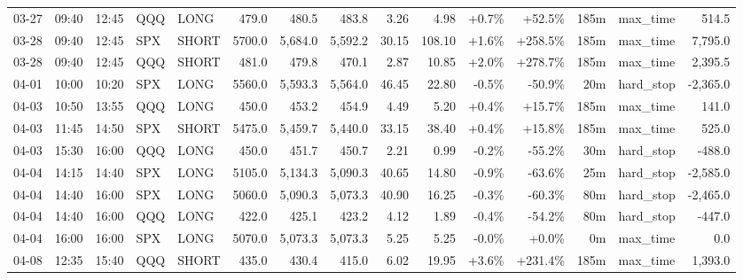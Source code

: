 \documentclass[11pt,a4paper,twoside]{article}
\begin{document}
\begin{landscape}
\begin{center}
\begin{longtable}{>{\color{txtmain}}l l l l l r r r r r r r r >{\color{txtmain}}l r}
03-27 & 09:40 & 12:45 & QQQ & LONG & 479.0 & 480.5 & 483.8 & 3.26 & 4.98 & \textcolor{wingreen}{+0.7\%} & \textcolor{wingreen}{+52.5\%} & 185m & max\_time & \textcolor{wingreen}{514.5} \\
03-28 & 09:40 & 12:45 & SPX & SHORT & 5700.0 & 5,684.0 & 5,592.2 & 30.15 & 108.10 & \textcolor{wingreen}{+1.6\%} & \textcolor{wingreen}{+258.5\%} & 185m & max\_time & \textcolor{wingreen}{7,795.0} \\
03-28 & 09:40 & 12:45 & QQQ & SHORT & 481.0 & 479.8 & 470.1 & 2.87 & 10.85 & \textcolor{wingreen}{+2.0\%} & \textcolor{wingreen}{+278.7\%} & 185m & max\_time & \textcolor{wingreen}{2,395.5} \\
04-01 & 10:00 & 10:20 & SPX & LONG & 5560.0 & 5,593.3 & 5,564.0 & 46.45 & 22.80 & \textcolor{lossred}{-0.5\%} & \textcolor{lossred}{-50.9\%} & 20m & hard\_stop & \textcolor{lossred}{-2,365.0} \\
04-03 & 10:50 & 13:55 & QQQ & LONG & 450.0 & 453.2 & 454.9 & 4.49 & 5.20 & \textcolor{wingreen}{+0.4\%} & \textcolor{wingreen}{+15.7\%} & 185m & max\_time & \textcolor{wingreen}{141.0} \\
04-03 & 11:45 & 14:50 & SPX & SHORT & 5475.0 & 5,459.7 & 5,440.0 & 33.15 & 38.40 & \textcolor{wingreen}{+0.4\%} & \textcolor{wingreen}{+15.8\%} & 185m & max\_time & \textcolor{wingreen}{525.0} \\
04-03 & 15:30 & 16:00 & QQQ & LONG & 450.0 & 451.7 & 450.7 & 2.21 & 0.99 & \textcolor{lossred}{-0.2\%} & \textcolor{lossred}{-55.2\%} & 30m & hard\_stop & \textcolor{lossred}{-488.0} \\
04-04 & 14:15 & 14:40 & SPX & LONG & 5105.0 & 5,134.3 & 5,090.3 & 40.65 & 14.80 & \textcolor{lossred}{-0.9\%} & \textcolor{lossred}{-63.6\%} & 25m & hard\_stop & \textcolor{lossred}{-2,585.0} \\
04-04 & 14:40 & 16:00 & SPX & LONG & 5060.0 & 5,090.3 & 5,073.3 & 40.90 & 16.25 & \textcolor{lossred}{-0.3\%} & \textcolor{lossred}{-60.3\%} & 80m & hard\_stop & \textcolor{lossred}{-2,465.0} \\
04-04 & 14:40 & 16:00 & QQQ & LONG & 422.0 & 425.1 & 423.2 & 4.12 & 1.89 & \textcolor{lossred}{-0.4\%} & \textcolor{lossred}{-54.2\%} & 80m & hard\_stop & \textcolor{lossred}{-447.0} \\
04-04 & 16:00 & 16:00 & SPX & LONG & 5070.0 & 5,073.3 & 5,073.3 & 5.25 & 5.25 & \textcolor{lossred}{-0.0\%} & \textcolor{wingreen}{+0.0\%} & 0m & max\_time & \textcolor{wingreen}{0.0} \\
04-08 & 12:35 & 15:40 & QQQ & SHORT & 435.0 & 430.4 & 415.0 & 6.02 & 19.95 & \textcolor{wingreen}{+3.6\%} & \textcolor{wingreen}{+231.4\%} & 185m & max\_time & \textcolor{wingreen}{1,393.0} \\

\end{longtable}
\end{center}
\end{landscape}
\end{document}

